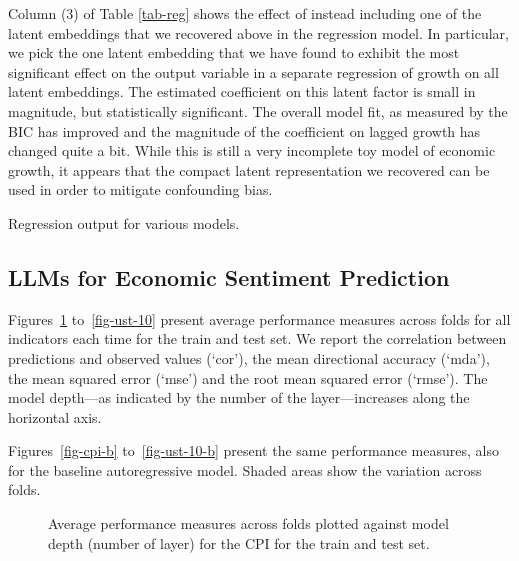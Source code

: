 \documentclass{article}
\theoremstyle{plain}
\theoremstyle{definition}
\theoremstyle{remark}
\begin{document}
Column (3) of Table \ref{tab-reg} shows the effect of instead including one of the latent embeddings that we recovered above in the regression model. In particular, we pick the one latent embedding that we have found to exhibit the most significant effect on the output variable in a separate regression of growth on all latent embeddings. The estimated coefficient on this latent factor is small in magnitude, but statistically significant. The overall model fit, as measured by the BIC has improved and the magnitude of the coefficient on lagged growth has changed quite a bit. While this is still a very incomplete toy model of economic growth, it appears that the compact latent representation we recovered can be used in order to mitigate confounding bias.

\begin{table}
\caption{Regression output for various models.}\label{tab-reg}%

\end{table}

\subsection{LLMs for Economic Sentiment Prediction}

Figures~\ref{fig-cpi} to~\ref{fig-ust-10} present average performance measures across folds for all indicators each time for the train and test set. We report the correlation between predictions and observed values (`cor'), the mean directional accuracy (`mda'), the mean squared error (`mse') and the root mean squared error (`rmse'). The model depth---as indicated by the number of the layer---increases along the horizontal axis.

Figures~\ref{fig-cpi-b} to~\ref{fig-ust-10-b} present the same performance measures, also for the baseline autoregressive model. Shaded areas show the variation across folds.
 

\begin{figure}


\caption{\label{fig-cpi}Average performance measures across folds plotted against model depth (number of layer) for the CPI for the train and test set.}

\end{figure}%
\end{document}
